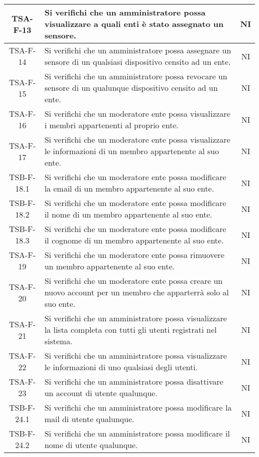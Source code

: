 \begin{center}
\begin{longtable}{|c|p{10cm}|c|}
			 \hline
			 TSA-F-13 & Si verifichi che un amministratore possa visualizzare a quali enti è stato assegnato un sensore. & NI \\
			 \hline
			 TSA-F-14 & Si verifichi che un amministratore possa assegnare un sensore di un qualsiasi dispositivo censito ad un ente. & NI \\
			 \hline
			 TSA-F-15 & Si verifichi che un amministratore possa revocare un sensore di un qualunque dispositivo censito ad un ente. & NI \\
			 \hline
			 TSA-F-16 &  Si verifichi che un moderatore ente possa visualizzare i membri appartenenti al proprio ente. & NI \\
			 \hline
			 TSA-F-17 & Si verifichi che un moderatore ente possa visualizzare le informazioni di un membro appartenente al suo ente. & NI \\
			 \hline
			 TSB-F-18.1 & Si verifichi che un moderatore ente possa modificare la email di un membro appartenente al suo ente. & NI \\
			 \hline
			 TSB-F-18.2 & Si verifichi che un moderatore ente possa modificare il nome di un membro appartenente al suo ente. & NI \\
			 \hline
			 TSB-F-18.3 & Si verifichi che un moderatore ente possa modificare il cognome di un membro appartenente al suo ente. & NI \\
			 \hline
			 TSA-F-19 & Si verifichi che un moderatore ente possa rimuovere un membro appartenente al suo ente. & NI \\
			 \hline 
			 TSA-F-20 & Si verifichi che un moderatore ente possa creare un nuovo account per un membro che apparterrà solo al suo ente. & NI \\
			 \hline
			 TSA-F-21 & Si verifichi che un amministratore possa visualizzare la lista completa con tutti gli utenti registrati nel sistema. & NI \\
			 \hline
			 TSA-F-22 & Si verifichi che un amministratore possa visualizzare le informazioni di uno qualsiasi degli utenti. & NI \\
			 \hline
			 TSA-F-23 & Si verifichi che un amministratore possa disattivare un account di utente qualunque. & NI \\
			 \hline
			 TSB-F-24.1 & Si verifichi che un amministratore possa modificare la mail di utente qualunque. & NI \\
			 \hline
			 TSB-F-24.2 & Si verifichi che un amministratore possa modificare il nome di utente qualunque. & NI \\

\end{longtable}
\end{center}
